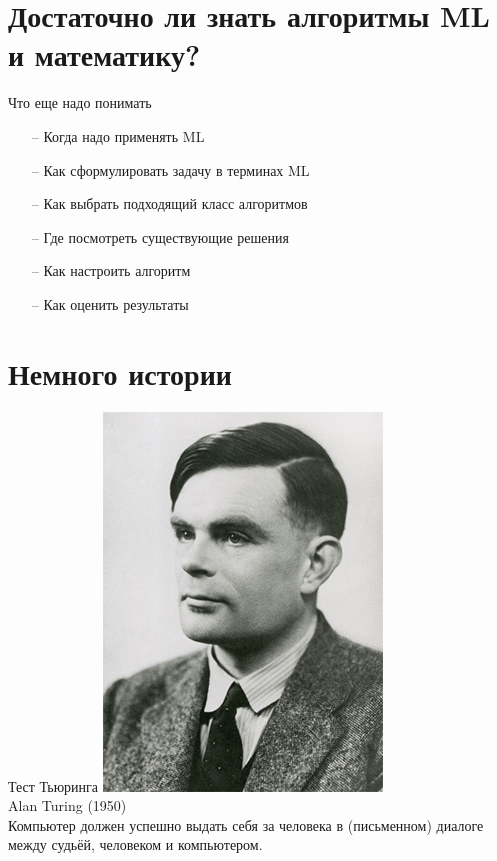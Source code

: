 \documentclass[10pt]{beamer}
\begin{document}
\section{Достаточно ли знать алгоритмы ML и математику?}

\begin{frame}{Что еще надо понимать}
	\begin{itemize} [<+->]
	  \item[--] Когда надо применять ML
	  \item[--] Как сформулировать задачу в терминах ML
	  \item[--] Как выбрать подходящий класс алгоритмов
	  \item[--] Где посмотреть существующие решения
	  \item[--] Как настроить алгоритм
	  \item[--] Как оценить результаты
	\end{itemize}
\end{frame}

\section{Немного истории}

\begin{frame}{Тест Тьюринга}
    \includegraphics[width=0.5 \linewidth, height=0.5 \textheight, keepaspectratio]{images/alan}\\
    Alan Turing (1950)\\
    \bigbreak
    Компьютер должен успешно выдать себя за человека в (письменном) диалоге между судьёй, человеком и компьютером.
\end{frame}
\end{document}
